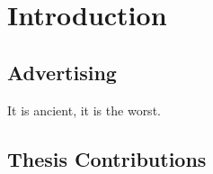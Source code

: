 \chapter{Introduction}

\section{Advertising}
It is ancient, it is the worst.

\section{Thesis Contributions}